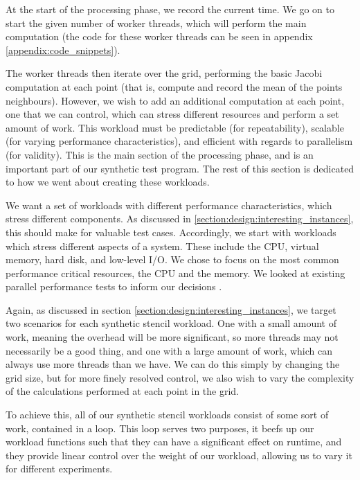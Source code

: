 At the start of the processing phase, we record the current time. We go on to start the given number of worker threads, which will perform the main computation (the code for these worker threads can be seen in appendix \ref{appendix:code_snippets}).

The worker threads then iterate over the grid, performing the basic Jacobi computation at each point (that is, compute and record the mean of the points neighbours). However, we wish to add an additional computation at each point, one that we can control, which can stress different resources and perform a set amount of work. This workload must be predictable (for repeatability), scalable (for varying performance characteristics), and efficient with regards to parallelism (for validity). This is the main section of the processing phase, and is an important part of our synthetic test program. The rest of this section is dedicated to how we went about creating these workloads.

We want a set of workloads with different performance characteristics, which stress different components. As discussed in \ref{section:design:interesting_instances}, this should make for valuable test cases. Accordingly, we start with workloads which stress different aspects of a system. These include the CPU, virtual memory, hard disk, and low-level I/O. We chose to focus on the most common performance critical resources, the CPU and the memory. We looked at existing parallel performance tests to inform our decisions \cite{hackenberg_ilsche_schone_molka_schmidt_nagel_2013, stress}.

Again, as discussed in section \ref{section:design:interesting_instances}, we target two scenarios for each synthetic stencil workload. One with a small amount of work, meaning the overhead will be more significant, so more threads may not necessarily be a good thing, and one with a large amount of work, which can always use more threads than we have. We can do this simply by changing the grid size, but for more finely resolved control, we also wish to vary the complexity of the calculations performed at each point in the grid.

To achieve this, all of our synthetic stencil workloads consist of some sort of work, contained in a loop. This loop serves two purposes, it beefs up our workload functions such that they can have a significant effect on runtime, and they provide linear control over the weight of our workload, allowing us to vary it for different experiments.

